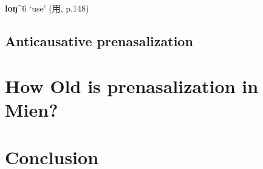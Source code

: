 \documentclass[oneside,a4paper,11pt]{article}
\newcommand{\ipa}[1]{\textbf{{\phon\mbox{#1}}}} %
\newcommand{\zh}[1]{{\cn #1}}
\newcommand{\mien}[5]{\ipa{#1}^{#2} `#3' (\zh{#4}, p.#5)}
\begin{document}
\mien{loŋ}{6}{use}{用}{148} 
\subsection{Anticausative prenasalization}

\citet[193-4]{jacques15causative}
\citet[285-288]{jacques15spontaneous}
\citet{jacques15derivational.khaling}

\section{How Old is prenasalization in Mien?}

\section*{Conclusion}



\end{document}
